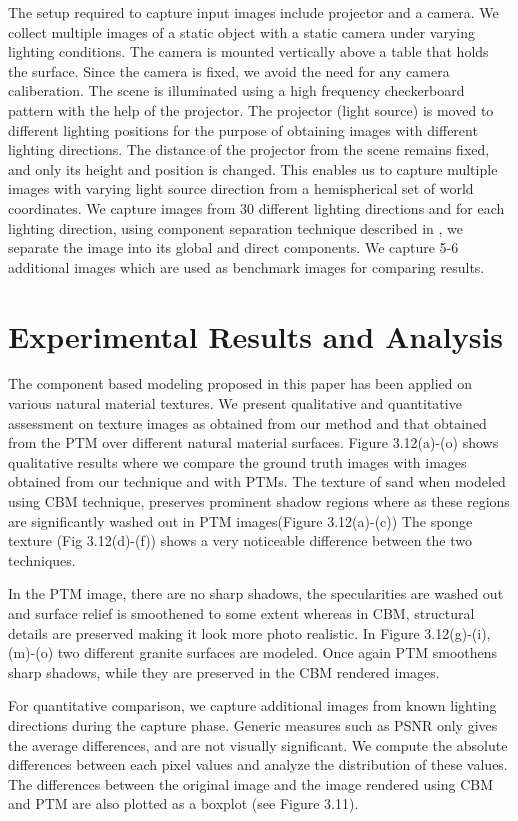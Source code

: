 The setup required to capture input images include projector and a camera.
We collect multiple images of a static object with a static camera under varying
lighting conditions. The
camera is mounted vertically above a table that holds the surface. Since the camera is fixed, we avoid the
need for any camera caliberation. 
The scene is illuminated using a high frequency checkerboard pattern with the help of the projector. The
projector (light source) is moved to different lighting positions for the purpose of obtaining
images with different lighting directions. 
The distance of the projector from
the scene remains fixed, and only its height and position is changed. This
enables us to capture multiple images with varying light source direction from a hemispherical set of world
coordinates. We capture images from 30 different lighting directions and for each
lighting direction, using component separation technique described in \cite{chap3-1},
we separate the image into its global and direct components. We capture 5-6 additional images which are used as 
benchmark images for comparing results.  


\section{Experimental Results and Analysis}

The component based modeling proposed in this paper has been applied on various
natural material textures. We present qualitative and quantitative assessment on
texture images as obtained from our method and that obtained from the PTM over
different natural material surfaces. Figure 3.12(a)-(o) shows qualitative results where we compare the
ground truth images with images obtained from our technique and with PTMs. The
texture of sand when modeled using CBM technique, preserves prominent shadow
regions where as these regions are significantly washed out in PTM images(Figure
3.12(a)-(c)) The sponge texture (Fig 3.12(d)-(f)) shows a very noticeable difference
between the two techniques.

In the PTM image, there are no sharp shadows, the specularities are washed out
and surface relief is smoothened to some extent whereas in CBM, structural
details are preserved making it look more photo realistic. In Figure 3.12(g)-(i),(m)-(o)
two different granite surfaces are modeled. Once again PTM smoothens sharp
shadows, while they are preserved in the CBM rendered images.

For quantitative comparison, we capture additional images from known lighting
directions during the capture phase. Generic measures such as PSNR only gives
the average differences, and are not visually significant. We compute the
absolute differences between each pixel values and analyze the distribution of
these values. The differences between the original image and the image rendered
using CBM and PTM are also plotted as a boxplot (see Figure 3.11).


